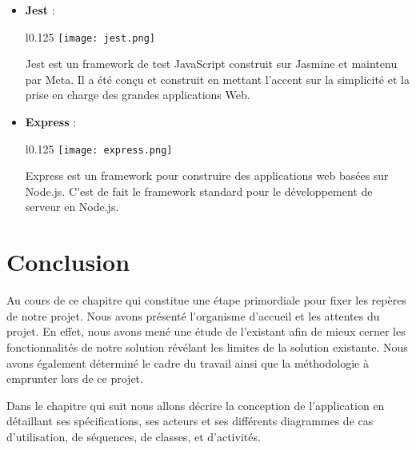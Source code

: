 \begin{itemize}
    \item \textbf{Jest} :\\
    \begin{minipage}{\linewidth}
      \begin{wrapfigure}{l}{0.125\textwidth}
        \vspace{-0.5cm}
        \texttt{[image: jest.png]} 
      \end{wrapfigure}
      Jest est un framework de test JavaScript construit sur Jasmine et maintenu par Meta. Il a été conçu et construit en mettant l'accent sur la simplicité et la prise en charge des grandes applications Web.
    \end{minipage}
  
    \vspace{0.5cm}
    \item \textbf{Express} :\\
    \begin{minipage}{\linewidth}
      \begin{wrapfigure}{l}{0.125\textwidth}
        \vspace{-0.5cm}
        \texttt{[image: express.png]}
      \end{wrapfigure}
      Express est un framework pour construire des applications web basées sur Node.js. C'est de fait le framework standard pour le développement de serveur en Node.js. 
    \end{minipage}

  
  \end{itemize}



\section*{Conclusion}
Au cours de ce chapitre qui constitue une étape primordiale pour fixer les repères de notre projet. Nous avons présenté l'organisme d'accueil et les attentes du projet. En effet, nous avons mené une étude de l'existant afin de mieux cerner les fonctionnalités de notre solution révélant les limites de la solution existante. Nous avons également déterminé le cadre du travail ainsi que la méthodologie à emprunter lors de ce projet.

Dans le chapitre qui suit nous allons décrire la conception de l'application en détaillant ses spécifications, ses acteurs et ses différents diagrammes de cas d'utilisation, de séquences, de classes, et d'activités.


